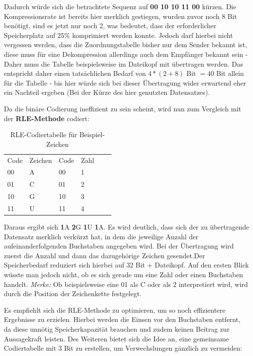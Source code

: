 \documentclass[11pt,a4paper,ngerman]{report}
\begin{document}
	    Dadurch würde sich die betrachtete Sequenz auf \textbf{00 10 10 11 00} kürzen. Die Kompressionsrate ist bereits hier merklich gestiegen, wurden zuvor noch 8 Bit benötigt, sind es jetzt nur noch 2, was bedeutet, dass der erforderlicher Speicherplatz auf 25\% komprimiert werden konnte. Jedoch darf hierbei nicht vergessen werden, dass die Zuordnungstabelle bisher nur dem Sender bekannt ist, diese muss für eine Dekompression allerdings auch dem Empfänger bekannt sein - Daher muss die Tabelle beispielsweise im  Dateikopf mit übertragen werden. Das entspricht daher einen tatsächlichen Bedarf von $4 * (2 +8)$ Bit $= 40$ Bit allein für die Tabelle - bis hier würde sich bei dieser Übertragung wider erwartend eher ein Nachteil ergeben (Bei der Kürze des hier genutzten Datensatzes).
		
		Da die binäre Codierung ineffizient zu sein scheint, wird nun zum Vergleich mit der  \textbf{RLE-Methode} codiert: 
		
				\begin{table} [H]
				\begin{center}
					\centering
					\begin{tabular}{llllll}
						Code  & Zeichen & Code & Zahl & &  \\
						00 & A    & 00    & 1   &  &  \\
						01 & C    & 01   & 2  &  &  \\
				     	10 & G    & 10    & 3  &  & \\
						11 & U	  & 11   & 4
						
					\end{tabular}
					\label{RLE}		
					\caption{RLE-Codiertabelle für Beispiel-Zeichen}
				\end{center}
				\end{table}
		
		Daraus ergibt sich  \textbf{1}A \textbf{2}G  \textbf{1}U \textbf{1}A. Es wird deutlich, dass sich der zu übertragende Datensatz merklich verkürzt hat, in dem die jeweilige Anzahl der aufeinanderfolgenden Buchstaben angegeben wird. Bei der Übertragung wird zuerst die Anzahl und dann das dazugehörige Zeichen gesendet.Der Speicherbedarf reduziert sich hierbei  auf $32$ Bit + Dateikopf. Auf den ersten Blick wüsste man jedoch nicht, ob es sich gerade um eine Zahl oder einen Buchstaben handelt.  \textit{Merke:} Ob beispielsweise eine 01 als C oder als 2 interpretiert wird, wird durch die Position der Zeichenkette festgelegt. 
			
		Es empfiehlt sich die RLE-Methode zu optimieren, um so noch effizientere Ergebnisse zu erzielen. Hierbei werden die Einsen vor den Buchstaben  entfernt, da diese unnötig Speicherkapazität brauchen und zudem keinen Beitrag zur Aussagekraft leisten. Des Weiteren bietet sich die Idee an, eine gemeinsame Codiertabelle mit 3 Bit zu erstellen, um Verwechslungen gänzlich zu vermeiden:
			
\end{document}
